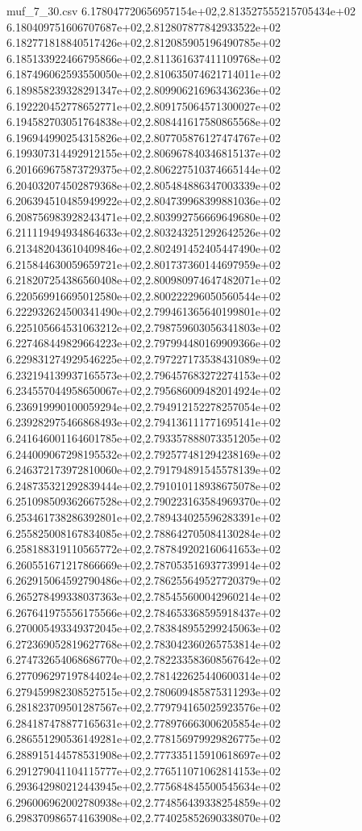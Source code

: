 \begin{filecontents*}{muf_7_30.csv}
6.178047720656957154e+02,2.813527555215705434e+02
6.180409751606707687e+02,2.812807877842933522e+02
6.182771818840517426e+02,2.812085905196490785e+02
6.185133922466795866e+02,2.811361637411109768e+02
6.187496062593550050e+02,2.810635074621714011e+02
6.189858239328291347e+02,2.809906216963436236e+02
6.192220452778652771e+02,2.809175064571300027e+02
6.194582703051764838e+02,2.808441617580865568e+02
6.196944990254315826e+02,2.807705876127474767e+02
6.199307314492912155e+02,2.806967840346815137e+02
6.201669675873729375e+02,2.806227510374665144e+02
6.204032074502879368e+02,2.805484886347003339e+02
6.206394510485949922e+02,2.804739968399881036e+02
6.208756983928243471e+02,2.803992756669649680e+02
6.211119494934864633e+02,2.803243251292642526e+02
6.213482043610409846e+02,2.802491452405447490e+02
6.215844630059659721e+02,2.801737360144697959e+02
6.218207254386560408e+02,2.800980974647482071e+02
6.220569916695012580e+02,2.800222296050560544e+02
6.222932624500341490e+02,2.799461365640199801e+02
6.225105664531063212e+02,2.798759603056341803e+02
6.227468449829664223e+02,2.797994480169909366e+02
6.229831274929546225e+02,2.797227173538431089e+02
6.232194139937165573e+02,2.796457683272274153e+02
6.234557044958650067e+02,2.795686009482014924e+02
6.236919990100059294e+02,2.794912152278257054e+02
6.239282975466868493e+02,2.794136111771695141e+02
6.241646001164601785e+02,2.793357888073351205e+02
6.244009067298195532e+02,2.792577481294238169e+02
6.246372173972810060e+02,2.791794891545578139e+02
6.248735321292839444e+02,2.791010118938675078e+02
6.251098509362667528e+02,2.790223163584969370e+02
6.253461738286392801e+02,2.789434025596283391e+02
6.255825008167834085e+02,2.788642705084130284e+02
6.258188319110565772e+02,2.787849202160641653e+02
6.260551671217866669e+02,2.787053516937739914e+02
6.262915064592790486e+02,2.786255649527720379e+02
6.265278499338037363e+02,2.785455600042960214e+02
6.267641975556175566e+02,2.784653368595918437e+02
6.270005493349372045e+02,2.783848955299245063e+02
6.272369052819627768e+02,2.783042360265753814e+02
6.274732654068686770e+02,2.782233583608567642e+02
6.277096297197844024e+02,2.781422625440600314e+02
6.279459982308527515e+02,2.780609485875311293e+02
6.281823709501287567e+02,2.779794165025923576e+02
6.284187478877165631e+02,2.778976663006205854e+02
6.286551290536149281e+02,2.778156979929826775e+02
6.288915144578531908e+02,2.777335115910618697e+02
6.291279041104115777e+02,2.776511071062814153e+02
6.293642980212443945e+02,2.775684845500545634e+02
6.296006962002780938e+02,2.774856439338254859e+02
6.298370986574163908e+02,2.774025852690338070e+02

\end{filecontents*}
